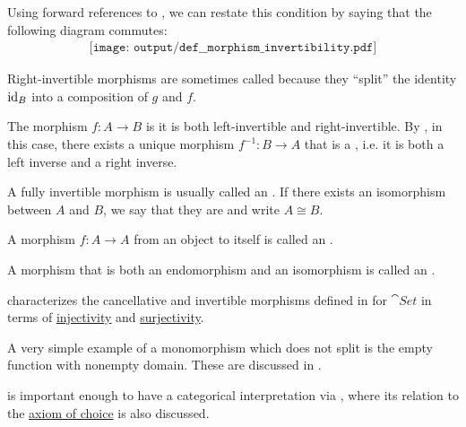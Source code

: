 \begin{definition}
\begin{thmenum}
    Using forward references to , we can restate this condition by saying that the following diagram commutes:
    \begin{equation}\label{eq:def:morphism_invertibility/right_invertible}
      \begin{aligned}
        \texttt{[image: output/def\_\_morphism\_invertibility.pdf]}
      \end{aligned}
    \end{equation}

    Right-invertible morphisms are sometimes called  because they \enquote{split} the identity \( \operatorname{id}_B \) into a composition of \( g \) and \( f \).

     The morphism \( f: A \to B \) is  it is both left-invertible and right-invertible. By , in this case, there exists a unique morphism \( f^{-1}: B \to A \) that is a , i.e. it is both a left inverse and a right inverse.

    A fully invertible morphism is usually called an . If there exists an isomorphism between \( A \) and \( B \), we say that they are  and write \( A \cong B \).

     A morphism \( f: A \to A \) from an object to itself is called an .

     A morphism that is both an endomorphism and an isomorphism is called an .
  \end{thmenum}
\end{definition}

\begin{example}\label{ex:def:morphism_invertibility}
   characterizes the cancellative and invertible morphisms defined in  for \hyperref[def:category_of_small_sets]{\( \cat{Set} \)} in terms of \hyperref[def:function_invertibility/injective]{injectivity} and \hyperref[def:function_invertibility/injective]{surjectivity}.

  A very simple example of a monomorphism which does not split is the empty function with nonempty domain. These are discussed in .

   is important enough to have a categorical interpretation via , where its relation to the \hyperref[def:zfc/choice]{axiom of choice} is also discussed.
\end{example}

